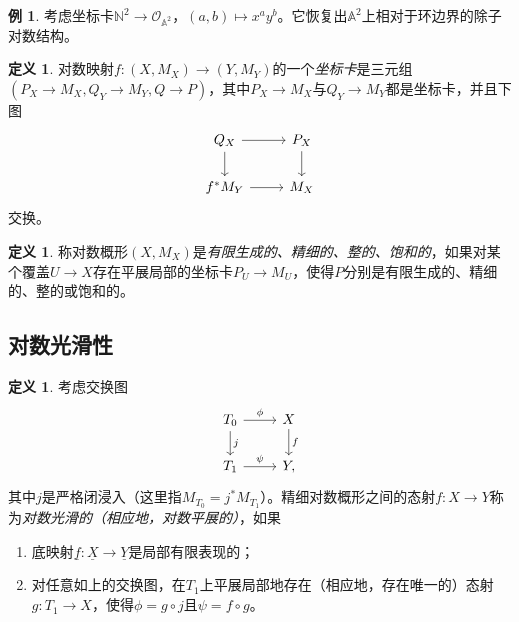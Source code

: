 \documentclass{amsart}
\theoremstyle{definition}
\newtheorem{defn}[thm]{定义}
\newtheorem{exm}[thm]{例}
\theoremstyle{remark}
\theoremstyle{plain}
\theoremstyle{definition}
\theoremstyle{remark}
\newcommand{\A}{\mathbb{A}}
\newcommand{\N}{\mathbb{N}}
\newcommand{\mc}[1]{\mathcal{#1}}
\newcommand{\ul}[1]{\underline{#1}}
\newcommand{\1}{\mathbf{1}}
\newcommand{\2}{\mathbf{2}}
\newcommand{\3}{\mathbf{3}}
\begin{document}
\begin{exm}
    考虑坐标卡\(\N^2 \to \mc{O}_{\A^2}\)，\((a,b) \mapsto x^a y^b\)。它恢复出\(\A^2\)上相对于环边界的除子对数结构。
\end{exm}

\begin{defn}
    对数映射\(f \colon (X, M_X) \to (Y, M_Y)\)的一个\textit{坐标卡}是三元组\((P_X\to M_X, Q_Y \to M_Y, Q \to P)\)，其中\(P_X \to M_X\)与\(Q_Y \to M_Y\)都是坐标卡，并且下图
    \begin{equation*}
    \begin{tikzcd}
        Q_X \ar{r} \ar{d} & P_X \ar{d} \\
        f^* M_Y \ar{r} & M_X
    \end{tikzcd}
    \end{equation*}
    交换。
\end{defn}

\begin{defn}
    称对数概形\((X, M_X)\)是\textit{有限生成的、精细的、整的、饱和的}，如果对某个覆盖\(U \to X\)存在平展局部的坐标卡\(P_U \to M_U\)，使得\(P\)分别是有限生成的、精细的、整的或饱和的。
\end{defn}

\subsection{对数光滑性}%
\label{sub:Log smoothness}

\begin{defn}
    考虑交换图
    \begin{equation*}
    \begin{tikzcd}
        T_0 \ar{r}{\phi} \ar{d}{j} & X \ar{d}{f} \\
        T_1 \ar{r}{\psi} & Y,
    \end{tikzcd}
    \end{equation*}
    其中\(j\)是严格闭浸入（这里指\(M_{T_0} = j^* M_{T_1}\)）。精细对数概形之间的态射\(f \colon X \to Y\)称为\textit{对数光滑的（相应地，对数平展的）}，如果
    \begin{enumerate}
        \item 底映射\(\ul{f} \colon \ul{X} \to \ul{Y}\)是局部有限表现的；
        \item 对任意如上的交换图，在\(T_1\)上平展局部地存在（相应地，存在唯一的）态射\(g \colon T_1 \to X\)，使得\(\phi = g \circ j\)且\(\psi = f \circ g\)。
    \end{enumerate}
\end{defn}
\end{document}
